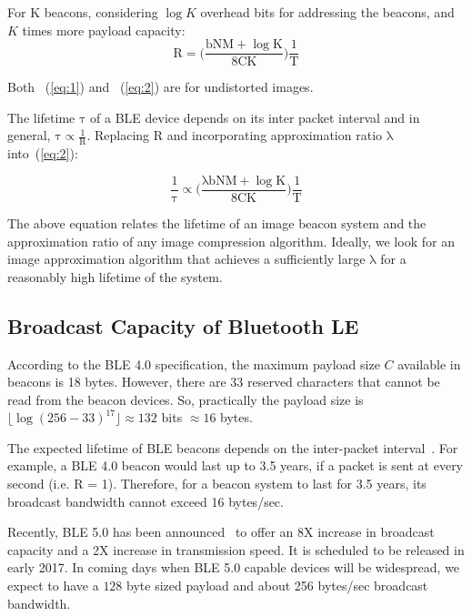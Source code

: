 For K beacons, considering $\log K$ overhead bits for addressing the beacons, and $K$ times more payload capacity:
\begin{equation}
	\mathrm{R = \bigg( \frac{bNM + \log K}{8CK} \bigg)  \frac{1}{T}}
	\label{eq:2}
\end{equation}

Both ~(\ref{eq:1}) and ~(\ref{eq:2}) are for undistorted images.



The lifetime $\mathrm{\tau}$ of a BLE device depends on its inter packet interval and in general, $\mathrm{\tau \propto \frac{1}{R}}$. Replacing $\mathrm{R}$ and incorporating approximation ratio $\mathrm{\lambda}$ into~(\ref{eq:2}):

\begin{equation}
	\mathrm{\frac{1}{\tau} \propto \bigg( \frac{\lambda bNM + \log K}{8CK} \bigg)  \frac{1}{T}}
	\label{eq:3}
\end{equation}

The above equation relates the lifetime of an image beacon system and the approximation ratio of any image compression algorithm. Ideally, we look for an image approximation algorithm that achieves a sufficiently large $\mathrm{\lambda}$ for a reasonably high lifetime of the system.



\subsection{Broadcast Capacity of Bluetooth LE}

According to the BLE 4.0 specification, the maximum payload size $C$ available in beacons is 18 bytes. However, there are 33 reserved characters that cannot be read from the beacon devices. So, practically the payload size is $\lfloor \log (256-33)^{17} \rfloor \approx 132$ bits $\approx 16$ bytes.

The expected lifetime of BLE beacons depends on the inter-packet interval~\cite{dementyev2013power}. For example, a BLE 4.0 beacon would last up to 3.5 years, if a packet is sent at every second (i.e. R = 1). Therefore, for a beacon system to last for 3.5 years, its broadcast bandwidth cannot exceed 16 bytes/sec.

Recently, BLE 5.0 has been announced~\cite{BLE5} to offer an 8X increase in broadcast capacity and a 2X increase in transmission speed. It is scheduled to be released in early 2017. In coming days when BLE 5.0 capable devices will be widespread, we expect to have a $128$ byte sized payload and about 256 bytes/sec broadcast bandwidth.

